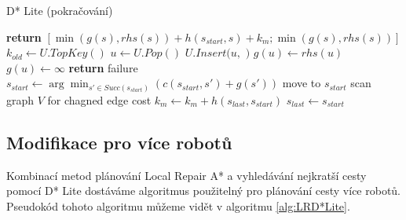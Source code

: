 \begin{algorithm}[H]
	\caption{D* Lite (pokračování)}
	\label{alg:DStarLiteP2}
	\begin{algorithmic}[1]
		\State \textbf{return} $[\min(g(s),rhs(s))+h(s_{start},s)+k_m;\min(g(s),rhs(s))]$
		\EndFunction
		\Statex
				\State $k_{old}\gets U.TopKey()$
				\State $u\gets U.Pop()$
					\State $U.Insert(u,$ $)$
					\State $g(u)\gets rhs(u)$
						\State {}
					\EndFor
				\Else
					\State $g(u)\gets \infty$
						\State {}
					\EndFor
				\EndIf
			\EndWhile
		\EndFunction
		\Statex
			\State {}
			\State {}
					\State \textbf{return} failure
				\EndIf
				\State $s_{start}\gets \arg\min_{s'\in Succ(s_{start})}(c(s_{start},s')+g(s'))$
				\State move to $s_{start}$
				\State scan graph $V$ for chagned edge cost
					\State $k_m\gets k_m+h(s_{last},s_{start})$
					\State $s_{last}\gets s_{start}$
						\State {}
					\EndFor
					\State {}
				\EndIf
			\EndWhile
		\EndFunction
	\end{algorithmic}
\end{algorithm}

\subsection{Modifikace pro více robotů}
Kombinací metod plánování Local Repair A* a vyhledávání nejkratší cesty pomocí D* Lite dostáváme algoritmus použitelný pro plánování cesty více robotů. Pseudokód tohoto algoritmu můžeme vidět v algoritmu \ref{alg:LRD*Lite}.

